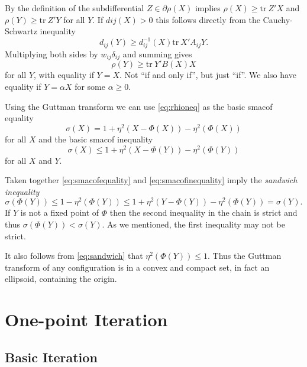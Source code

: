 \documentclass[
  12pt,
]{article}
\begin{document}
By the definition of the subdifferential \(Z\in\partial\rho(X)\) implies \(\rho(X)\geq\text{tr}\ Z'X\) and \(\rho(Y)\geq\text{tr}\ Z'Y\) for all \(Y\). If
\(d{ij}(X)>0\) this follows directly from the Cauchy-Schwartz inequality
\begin{equation}
d_{ij}(Y)\geq d_{ij}^{-1}(X)\text{tr}\ X'A_{ij}Y.
\label{eq:csineq}
\end{equation}
Multiplying both sides by \(w_{ij}\delta_{ij}\) and summing gives
\begin{equation}
\rho(Y)\geq\text{tr}\ Y'B(X)X
\label{eq:rhoineq}
\end{equation}
for all \(Y\), with equality if \(Y=X\). Not ``if and only if'', but just ``if''. We
also have equality if \(Y=\alpha X\) for some \(\alpha\geq 0\).

Using the Guttman transform we can use \eqref{eq:rhioneq} as the basic smacof equality
\begin{equation}
\sigma(X)=1+\eta^2(X-\Phi(X))-\eta^2(\Phi(X))
\label{eq:smacofequality}
\end{equation}
for all \(X\) and the basic smacof inequality
\begin{equation}
\sigma(X)\leq 1+\eta^2(X-\Phi(Y))-\eta^2(\Phi(Y))
\label{eq:smacofinequality}
\end{equation}
for all \(X\) and \(Y\).

Taken together \eqref{eq:smacofequality} and \eqref{eq:smacofinequality} imply the \emph{sandwich inequality}
\begin{equation}
\sigma(\Phi(Y))\leq 1-\eta^2(\Phi(Y))\leq 1+\eta^2(Y-\Phi(Y))-\eta^2(\Phi(Y))=\sigma(Y).
\label{eq:sandwich}
\end{equation}
If \(Y\) is not a fixed point of \(\Phi\) then the second inequality in the
chain is strict and thus \(\sigma(\Phi(Y))<\sigma(Y)\). As we mentioned, the
first inequality may not be strict.

It also follows
from \eqref{eq:sandwich} that \(\eta^2(\Phi(Y))\leq 1\). Thus the Guttman
transform of any configuration is in a convex and compact set, in fact an ellipsoid,
containing the origin.

\section{One-point Iteration}\label{one-point-iteration}

\subsection{Basic Iteration}\label{basic-iteration}
\end{document}
